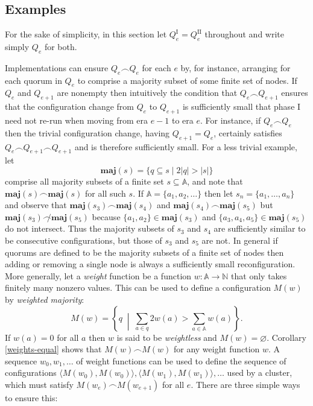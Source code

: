 \documentclass[journal]{IEEEtran}
\begin{document}
\subsection{Examples}\label{types-of-configuration-change}

For the sake of simplicity, in this section let $Q^\textrm{I}_e =
Q^\textrm{II}_e$ throughout and write simply $Q_e$ for both.

\def\maj#1{\mathbf{maj}(#1)}

Implementations can ensure $Q_e \frown Q_e$ for each $e$ by, for instance,
arranging for each quorum in $Q_e$ to comprise a majority subset of some finite
set of nodes.  If $Q_e$ and $Q_{e+1}$ are nonempty then intuitively the
condition that $Q_e \frown Q_{e+1}$ ensures that the configuration change from
$Q_e$ to $Q_{e+1}$ is sufficiently small that phase I need not re-run when
moving from era $e-1$ to era $e$.  For instance, if $Q_e \frown Q_e$ then the
trivial configuration change, having $Q_{e+1} = Q_e$, certainly satisfies $Q_e
\frown Q_{e+1} \frown Q_{e+1}$ and is therefore sufficiently small.
%
For a less trivial example, let \[\maj{s} = \{ q \subseteq s \mid 2 |q| > |s|
\}\] comprise all majority subsets of a finite set $s \subseteq \mathbb A$, and
note that $\maj{s} \frown \maj{s}$ for all such $s$.  If $\mathbb A = \{ a_1,
a_2, \ldots \}$ then let $s_n = \{a_1, \ldots, a_n\}$ and observe that
${\maj{s_3} \frown \maj{s_4}}$ and ${\maj{s_4} \frown \maj{s_5}}$ but
${\maj{s_3} \not\frown \maj{s_5}}$ because $\{a_1, a_2\} \in \maj{s_3}$ and
$\{a_3, a_4, a_5\} \in \maj{s_5}$ do not intersect. Thus the majority subsets
of $s_3$ and $s_4$ are sufficiently similar to be consecutive configurations,
but those of $s_3$ and $s_5$ are not. In general if quorums are defined to be
the majority subsets of a finite set of nodes then adding or removing a single
node is always a sufficiently small reconfiguration.  More generally, let a
\textit{weight} function be a function $w : \mathbb A \to \mathbb N$ that only
takes finitely many nonzero values. This can be used to define a configuration
$M(w)$ by \textit{weighted majority}: \[M(w) = \left\{ q \;\middle|\; \sum_{a
\in q} 2 w(a) > \sum_{a \in \mathbb A} w(a) \right\}.\] If $w(a) = 0$ for all
$a$ then $w$ is said to be \textit{weightless} and $M(w) = \varnothing$.
Corollary \ref{weights-equal} shows that $M(w) \frown M(w)$ for any weight
function $w$.
%
A sequence $w_0, w_1, \ldots$ of weight functions can be used to define the
sequence of configurations $\langle M(w_0), M(w_0) \rangle, \langle M(w_1),
M(w_1) \rangle, \ldots$ used by a cluster, which must satisfy $M(w_e) \frown
M(w_{e+1})$ for all $e$.  There are three simple ways to ensure this:
\end{document}
